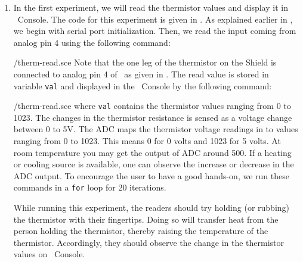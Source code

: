 \begin{enumerate}
  \item In the first experiment, we will read the thermistor values and display it in
        \scilab\ Console. The code for this experiment is
        given in . As explained earlier in ,
        we begin with serial port initialization. Then, we read the input coming from
        analog pin 4 using the following command:
        
        {\LocTHERMscicode/therm-read.sce}
        Note that the one leg of the thermistor on
        the Shield is connected to analog pin 4 of \arduino\,
        as given in . The read value is stored in variable {\tt val} and
        displayed in the \scilab\ Console by the following command:
        
        {\LocTHERMscicode/therm-read.sce} where {\tt val} contains
        the thermistor values ranging from 0 to 1023. The changes in
        the thermistor resistance is sensed as a voltage change between 0 to
        5V. The ADC maps the thermistor voltage readings in to values
        ranging from 0 to 1023. This means 0 for 0 volts and 1023 for 5
        volts. At room temperature you may get the
        output of ADC around 500. If a heating or cooling source is available,
        one can observe the increase or decrease in the ADC output. To
        encourage the user to have a good hands-on, we run these commands in
        a {\tt for} loop for 20 iterations.

        While running this experiment,
        the readers should try holding (or rubbing) the thermistor with their fingertips.
        Doing so will transfer heat from the person holding the
        thermistor, thereby raising the temperature of the thermistor. Accordingly, they should observe the change in the thermistor
        values on \scilab\ Console.




\end{enumerate}
